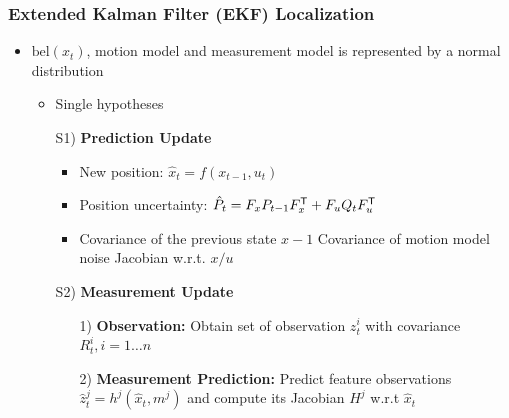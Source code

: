 \subsubsection{Extended Kalman Filter (EKF) Localization}
\begin{itemize}
    \item $\text{bel}(x_t)$, motion model and measurement model is represented by a normal distribution
        \begin{itemize}
            \item Single hypotheses
        \end{itemize}
        \begin{itemize}
            \item[S1)] \textbf{Prediction Update}
                \begin{itemize}
                    \item New position: $\hat x_t = f(x_{t-1}, u_t)$
                    \item Position uncertainty: $\hat P_t = F_x P_{t-1} F_x^{\mathsf{T}} + F_u Q_t F_u^{\mathsf{T}}$
                    \item
                        \begin{itemize*}
                             Covariance of the previous state $x - 1$
                             Covariance of motion model noise
                             Jacobian w.r.t. $x/u$
                        \end{itemize*}
                \end{itemize}
            \item[S2)] \textbf{Measurement Update}
                \begin{itemize}
                    \item[1)] \textbf{Observation:} Obtain set of observation $z_t^i$ with covariance $R_t^i, i=1 \dots n$
                    \item[2)] \textbf{Measurement Prediction:} Predict feature observations $\hat z_t^j = h^j(\hat x_t, m^j)$ and compute its Jacobian $H^j$ w.r.t $\hat x_t$


\end{itemize}
\end{itemize}
\end{itemize}

